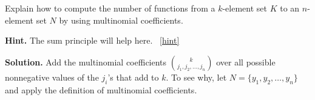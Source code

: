 \documentclass{book}
\begin{document}
\setcounter{project}{282}
\addtocounter{project}{-1}
\begin{activity}[]\label{activity-275}
\hypertarget{p-1472}{}%
Explain how to compute the number of functions from a \(k\)-element set \(K\) to an \(n\)-element set \(N\) by using multinomial coefficients.%
\par\smallskip%
\noindent\textbf{Hint.}\hypertarget{hint-184}{}\quad%
\hypertarget{p-1473}{}%
The sum principle will help here.%
~\hfill{\tiny\hyperlink{a-282}{[hint]}\hypertarget{q-282}{}}\par\smallskip%
\noindent\textbf{Solution.}\hypertarget{solution-205}{}\quad%
\hypertarget{p-1474}{}%
Add the multinomial coefficients \(\binom{k}{j_1,j_2,\ldots,j_n}\) over all possible nonnegative values of the \(j_i\)'s that add to \(k\).  To see why, let \(N=\{y_1,y_2,\ldots,y_n\}\) and apply the definition of multinomial coefficients.%
\end{activity}
\end{document}
